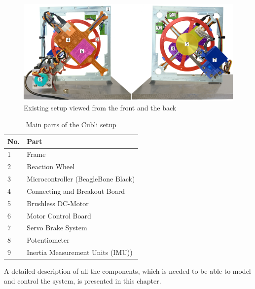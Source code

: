 \begin{figure}[H]
	\centering
	\includegraphics[scale=0.27]{figures/Cubli12}
	\caption{Existing setup viewed from the front and the back}
	\label{CubliParts}
\end{figure}
%
\begin{table}[H]
	\centering
	\begin{tabular}{|l|p{6.7cm}|}
		\hline %
		\textbf{No.} &\textbf{Part} 			\\
		\hline %
		1            & Frame           			\\
		\hline %
		2            & Reaction Wheel      		\\
		\hline %
		3            & Microcontroller (BeagleBone Black)  \\
		\hline %
		4            & Connecting and Breakout Board 			\\
		\hline %
		5            & Brushless DC-Motor       			\\
		\hline %
		6            & Motor Control Board   	\\
		\hline %
		7            & Servo Brake System     	\\
		\hline %
		8            & Potentiometer 		    	\\
		\hline %
		9            & Inertia Measurement Units (IMU)) 		    	\\
		\hline %
	\end{tabular}
	\caption{Main parts of the Cubli setup}
	\label{tab:TableAAUCubliComponent}
\end{table}
%
A detailed description of all the components, which is needed to be able to model and control the system, is presented in this chapter.

